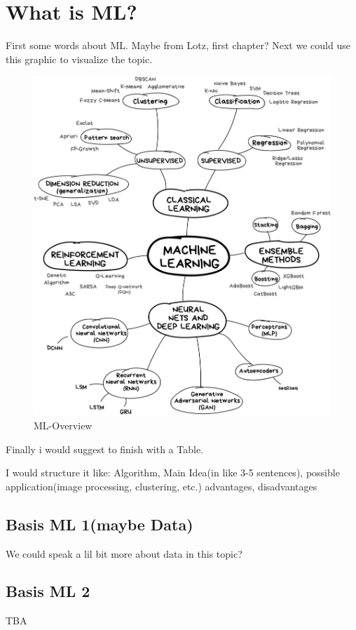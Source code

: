 \section{What is ML?}
First some words about ML. Maybe from Lotz, first chapter?
Next we could use this graphic to visualize the topic.
\begin{figure}[hbtp]
	\centering
	\includegraphics[width=1\textwidth]{ML}
	\caption{ML-Overview}
	\label{fig:Datensatz - unbearbeitet}
\end{figure}

Finally i would suggest to finish with a Table.

I would structure it like:
Algorithm, Main Idea(in like 3-5 sentences), possible application(image processing, clustering, etc.) advantages, disadvantages


\subsection{Basis ML 1(maybe Data)}
We could speak a lil bit more about data in this topic?





\subsection{Basis ML 2}
TBA





\newpage
